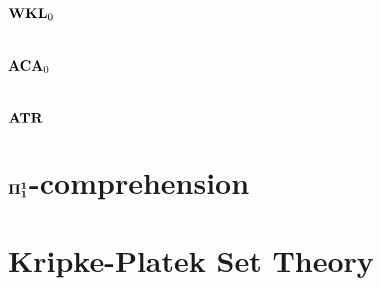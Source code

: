 \documentclass[8pt]{article}
\theoremstyle{definition}
\theoremstyle{definition}
\theoremstyle{definition}
\theoremstyle{definition}
\theoremstyle{definition}
\theoremstyle{definition}
\theoremstyle{definition}
\theoremstyle{definition}
\theoremstyle{definition}
\theoremstyle{definition}
\theoremstyle{definition}
\theoremstyle{definition}
\theoremstyle{definition}
\theoremstyle{question}
\begin{document}
\section{${\bf WKL}_0$}

\section{${\bf ACA}_0$}

\section{${\bf ATR}$}

\section{${\bf \Pi_1^1}$-comprehension}

\section{Kripke-Platek Set Theory}




\end{document}
